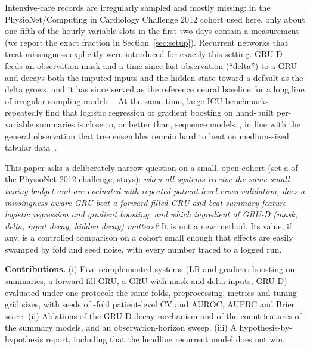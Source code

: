 Intensive-care records are irregularly sampled and mostly missing: in the PhysioNet/Computing in Cardiology Challenge 2012 cohort used here, only about one fifth of the hourly variable slots in the first two days contain a measurement (we report the exact fraction in Section~\ref{sec:setup}). Recurrent networks that treat missingness explicitly were introduced for exactly this setting. GRU-D~\cite{che2016recurrent} feeds an observation mask and a time-since-last-observation (``delta'') to a GRU and decays both the imputed inputs and the hidden state toward a default as the delta grows, and it has since served as the reference neural baseline for a long line of irregular-sampling models~\cite{shukla2019interpolation,horn2019set,rubanova2019latent,zhang2021graph,tipirneni2021self}. At the same time, large ICU benchmarks repeatedly find that logistic regression or gradient boosting on hand-built per-variable summaries is close to, or better than, sequence models~\cite{harutyunyan2017multitask,yche2021hirid,water2023yet}, in line with the general observation that tree ensembles remain hard to beat on medium-sized tabular data~\cite{grinsztajn2022why}.

This paper asks a deliberately narrow question on a small, open cohort (set-a of the PhysioNet 2012 challenge,  stays): \emph{when all systems receive the same small tuning budget and are evaluated with repeated patient-level cross-validation, does a missingness-aware GRU beat a forward-filled GRU and beat summary-feature logistic regression and gradient boosting, and which ingredient of GRU-D (mask, delta, input decay, hidden decay) matters?} It is not a new method. Its value, if any, is a controlled comparison on a cohort small enough that effects are easily swamped by fold and seed noise, with every number traced to a logged run.

\textbf{Contributions.} (i) Five reimplemented systems (LR and gradient boosting on summaries, a forward-fill GRU, a GRU with mask and delta inputs, GRU-D) evaluated under one protocol: the same folds, preprocessing, metrics and tuning grid sizes, with  seeds of -fold patient-level CV and AUROC, AUPRC and Brier score. (ii) Ablations of the GRU-D decay mechanism and of the count features of the summary models, and an observation-horizon sweep. (iii) A hypothesis-by-hypothesis report, including that the headline recurrent model does not win.
